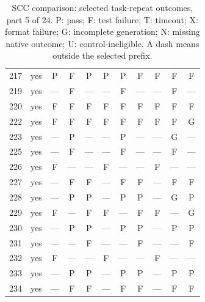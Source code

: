 \begin{table}[p]
\begin{tabular*}{\textwidth}{@{\extracolsep{\fill}}rc*{9}{c}@{}}
217 & yes & P & F & P & P & P & F & F & F & F\\
219 & yes & — & F & — & — & F & — & — & F & —\\
220 & yes & F & F & F & F & F & F & F & F & F\\
222 & yes & F & F & F & F & F & F & F & F & G\\
223 & yes & — & P & — & — & P & — & — & G & —\\
225 & yes & — & F & — & — & F & — & — & F & —\\
226 & yes & F & — & — & F & — & — & F & — & —\\
227 & yes & — & F & F & — & F & F & — & F & F\\
228 & yes & — & P & P & — & P & P & — & G & P\\
229 & yes & F & — & F & F & — & F & F & — & G\\
230 & yes & — & P & P & — & P & P & — & P & P\\
231 & yes & — & — & F & — & — & F & — & — & F\\
232 & yes & F & — & — & F & — & — & F & — & —\\
233 & yes & — & P & P & — & P & P & — & P & P\\
234 & yes & — & F & F & — & F & F & — & F & F\\
\bottomrule\end{tabular*}
\caption{SCC comparison: selected task-repeat outcomes, part 5 of 24. P: pass; F: test failure; T: timeout; X: format failure; G: incomplete generation; N: missing native outcome; U: control-ineligible. A dash means outside the selected prefix.}
\end{table}
\clearpage
